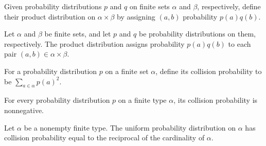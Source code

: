 \begin{definition}
\label{TCSlib.InformationTheory.FinDist.prod}
\leanok
{}
Given probability distributions $p$ and $q$ on finite sets $\alpha$ and $\beta$,
respectively, define their product distribution on $\alpha\times\beta$ by assigning
$(a,b)$ probability $p(a)q(b)$.
\end{definition}

\begin{theorem}
\label{TCSlib.InformationTheory.FinDist.prod_apply}
\leanok
{}
Let $\alpha$ and $\beta$ be finite sets, and let $p$ and $q$ be probability
distributions on them, respectively. The product distribution assigns probability
$p(a)q(b)$ to each pair $(a,b)\in\alpha\times\beta$.
\end{theorem}

\begin{definition}
\label{TCSlib.InformationTheory.FinDist.collision}
\leanok
{}
For a probability distribution $p$ on a finite set $\alpha$, define its collision
probability to be $\sum_{a\in\alpha}p(a)^2$.
\end{definition}

\begin{theorem}
\label{TCSlib.InformationTheory.FinDist.collision_nonneg}
\leanok
{}
For every probability distribution $p$ on a finite type $\alpha$, its collision probability is nonnegative.
\end{theorem}

\begin{theorem}
\label{TCSlib.InformationTheory.FinDist.collision_uniform}
\leanok
{}
Let $\alpha$ be a nonempty finite type. The uniform probability distribution on $\alpha$ has collision probability equal to the reciprocal of the cardinality of $\alpha$.
\end{theorem}

